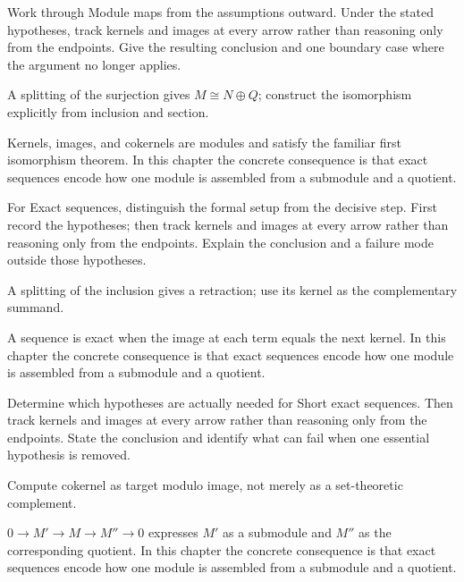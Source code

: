 \begin{exercise}\label{exr:v09-03}
Work through Module maps from the assumptions outward. Under the stated hypotheses, track kernels and images at every arrow rather than reasoning only from the endpoints. Give the resulting conclusion and one boundary case where the argument no longer applies.
\end{exercise}
\begin{hint}
A splitting of the surjection gives \(M\cong N\oplus Q\); construct the isomorphism explicitly from inclusion and section.
\end{hint}
\begin{solution}
Kernels, images, and cokernels are modules and satisfy the familiar first isomorphism theorem. In this chapter the concrete consequence is that exact sequences encode how one module is assembled from a submodule and a quotient.
\end{solution}

\begin{exercise}\label{exr:v09-04}
For Exact sequences, distinguish the formal setup from the decisive step. First record the hypotheses; then track kernels and images at every arrow rather than reasoning only from the endpoints. Explain the conclusion and a failure mode outside those hypotheses.
\end{exercise}
\begin{hint}
A splitting of the inclusion gives a retraction; use its kernel as the complementary summand.
\end{hint}
\begin{solution}
A sequence is exact when the image at each term equals the next kernel. In this chapter the concrete consequence is that exact sequences encode how one module is assembled from a submodule and a quotient.
\end{solution}

\begin{exercise}\label{exr:v09-05}
Determine which hypotheses are actually needed for Short exact sequences. Then track kernels and images at every arrow rather than reasoning only from the endpoints. State the conclusion and identify what can fail when one essential hypothesis is removed.
\end{exercise}
\begin{hint}
Compute cokernel as target modulo image, not merely as a set-theoretic complement.
\end{hint}
\begin{solution}
$0\to M'\to M\to M''\to0$ expresses $M'$ as a submodule and $M''$ as the corresponding quotient. In this chapter the concrete consequence is that exact sequences encode how one module is assembled from a submodule and a quotient.
\end{solution}

